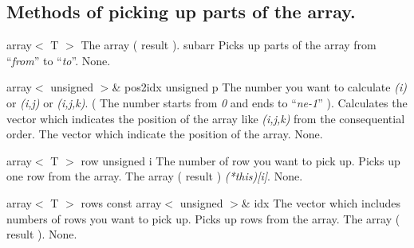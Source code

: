 \clearpage
\subsection{Methods of picking up parts of the array.}

\setConstInstance
\setCorrectWidthThree{8pt}
\printMethodWithParamsSaved
{array$<$ T $>$}
{The array ( result ).}
{subarr}
{Picks up parts of the array from ``{\em from}'' to ``{\em to}''.}
{None.}
\setCorrectWidthThree{4pt}

\setConstInstance
\printMethodWithOneParam
{array$<$ unsigned $>$\&}
{pos2idx}
{unsigned}
{p}
{The number you want to calculate {\em (i)} or {\em (i,j)} or {\em (i,j,k)}. (
The number starts from {\em 0} and ends to ``{\em ne-1}'' ).}
{Calculates the vector which indicates the position of the array like
{\em (i,j,k)} from the consequential order.}
{The vector which indicate the position of the array.}
{None.}


\setConstInstance
\printMethodWithOneParam
{array$<$ T $>$}
{row}
{unsigned}
{i}
{The number of row you want to pick up.}
{Picks up one row from the array.}
{The array ( result ) {\em (*this)[i]}.}
{None.}

\setConstInstance
\printMethodWithOneParam
{array$<$ T $>$}
{rows}
{const array$<$ unsigned $>$\&}
{idx}
{The vector which includes numbers of rows you want to pick up.}
{Picks up rows from the array.}
{The array ( result ).}
{None.}

